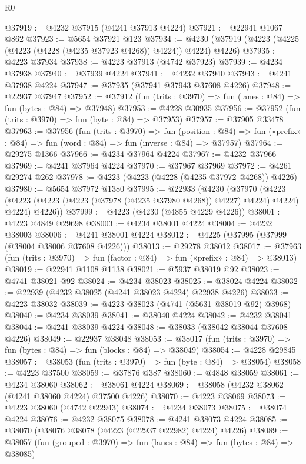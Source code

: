 \begin{lexlean}{R0}
\begin{coremodule}
@37919 := @4232 @37915 (@4241 @37913 @4224)
@37921 := @22941 @1067 @862
@37923 := @5654 @37921 @123
@37934 := @4230 (@37919 (@4223 (@4225 (@4223 (@4228 (@4235 @37923 @4268)) @4224)) @4224) @4226)
@37935 := @4223 @37934
@37938 := @4223 @37913 (@4742 @37923)
@37939 := @4234 @37938
@37940 := @37939 @4224
@37941 := @4232 @37940
@37943 := @4241 @37938 @4224
@37947 := @37935 (@37941 @37943 @37608 @4226)
@37948 := @22937 @37947
@37952 := @37912 (fun (trits : @3970) => fun (lanes : @84) => fun (bytes : @84) => @37948)
@37953 := @4228 @30935
@37956 := @37952 (fun (trits : @3970) => fun (byte : @84) => @37953)
@37957 := @37905 @33478
@37963 := @37956
    (fun (trits : @3970) =>
    fun (position : @84) =>
    fun («prefix» : @84) => fun (word : @84) => fun (inverse : @84) => @37957)
@37964 := @29275 @1366
@37966 := @4234 @37964 @4224
@37967 := @4232 @37966
@37969 := @4241 @37964 @4224
@37970 := @37967 @37969
@37972 := @4261 @29274 @262
@37978 := @4223 (@4223 (@4228 (@4235 @37972 @4268)) @4226)
@37980 := @5654 @37972 @1380
@37995 := @22933
    (@4230
      (@37970
        (@4223 (@4223 (@4223 (@4223 (@37978 (@4235 @37980 @4268)) @4227) @4224) @4224) @4224)
        @4226))
@37999 := @4223 (@4230 (@4855 @4229 @4226))
@38001 := @4223 @4849 @29698
@38003 := @4234 @38001 @4224
@38004 := @4232 @38003
@38006 := @4241 @38001 @4224
@38012 := @4225 (@37995 (@37999 (@38004 @38006 @37608 @4226)))
@38013 := @29278 @38012
@38017 := @37963 (fun (trits : @3970) => fun (factor : @84) => fun («prefix» : @84) => @38013)
@38019 := @22941 @1108 @1138
@38021 := @5937 @38019 @92
@38023 := @4741 @38021 @92
@38024 := @4234 @38023
@38025 := @38024 @4224
@38032 := @22939 (@4232 @38025 (@4241 @38023 @4224) @22938 @4226)
@38033 := @4223 @38032
@38039 := @4223 @38023 (@4741 (@5631 @38019 @92) @3968)
@38040 := @4234 @38039
@38041 := @38040 @4224
@38042 := @4232 @38041
@38044 := @4241 @38039 @4224
@38048 := @38033 (@38042 @38044 @37608 @4226)
@38049 := @22937 @38048
@38053 := @38017 (fun (trits : @3970) => fun (bytes : @84) => fun (blocks : @84) => @38049)
@38054 := @4228 @29845
@38057 := @38053 (fun (trits : @3970) => fun (byte : @84) => @38054)
@38058 := @4223 @37500
@38059 := @37876 @387
@38060 := @4848 @38059
@38061 := @4234 @38060
@38062 := @38061 @4224
@38069 := @38058 (@4232 @38062 (@4241 @38060 @4224) @37500 @4226)
@38070 := @4223 @38069
@38073 := @4223 @38060 (@4742 @22943)
@38074 := @4234 @38073
@38075 := @38074 @4224
@38076 := @4232 @38075
@38078 := @4241 @38073 @4224
@38085 := @38070 (@38076 @38078 (@4223 (@22937 @22982) @4224) @4226)
@38089 := @38057 (fun (grouped : @3970) => fun (lanes : @84) => fun (bytes : @84) => @38085)

\end{coremodule}
\end{lexlean}
